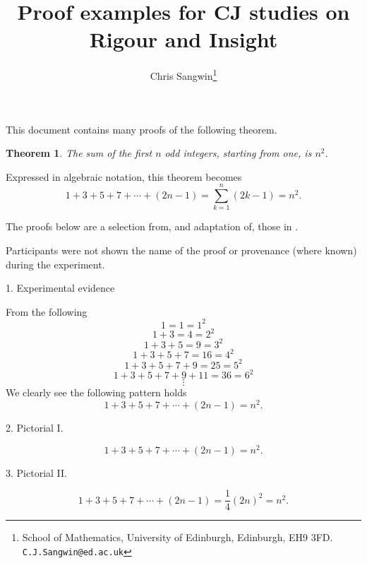 \documentclass{article}
\title{Proof examples for CJ studies on Rigour and Insight}
\author{Chris Sangwin\footnote{School of Mathematics, University of Edinburgh, Edinburgh, EH9 3FD.  {\tt C.J.Sangwin@ed.ac.uk}}}
\date{}
\newtheorem{theorem}{Theorem}
\begin{document}
	
\maketitle

This document contains many proofs of the following theorem.
\begin{theorem}\label{thm}
  The sum of the first \(n\) odd integers, starting from one, is \(n^2\).
\end{theorem}
Expressed in algebraic notation, this theorem becomes
\begin{equation}\label{eq:thm}
1+3+5+7+\cdots+(2n-1)=\sum_{k=1}^n (2k-1) = n^2.
\end{equation}

The proofs below are a selection from, and adaptation of, those in \autocite{2023-Sum-Odd-Num}.

Participants were not shown the name of the proof or provenance (where known) during the experiment.

\printbibliography{}

\newpage

1. Experimental evidence

From the following
\[ 1 = 1 = 1^2 \]
\[ 1+3 = 4 = 2^2 \]
\[ 1+3+5 = 9 = 3^2 \]
\[ 1+3+5+7 = 16 = 4^2 \]
\[ 1+3+5+7+9 = 25 = 5^2 \]
\[ 1+3+5+7+9+11 = 36 = 6^2 \]
\[ \vdots\]
We clearly see the following pattern holds
\[ 1+3+5+7+\cdots+(2n-1) = n^2.\]


2. Pictorial I.

\begin{center}
\end{center}
\[ 1+3+5+7+\cdots+(2n-1) = n^2.\]

\newpage
3. Pictorial II.

\begin{center}
\end{center}
\[ 1+3+5+7+\cdots+(2n-1) = \frac{1}{4}(2n)^2 = n^2.\]
\end{document}
